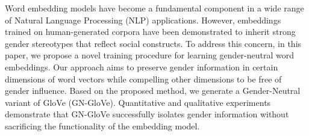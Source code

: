 Word embedding models have become a fundamental component in a wide range of Natural Language Processing (NLP) applications. 
However, embeddings trained on human-generated corpora have been demonstrated to inherit strong gender stereotypes that reflect social constructs. 
To address this concern, in this paper, we propose a novel training procedure for learning gender-neutral word embeddings. Our approach aims to preserve gender information in certain dimensions of word vectors while compelling other dimensions to be free of gender influence. Based on the proposed method, we generate a Gender-Neutral variant of GloVe (GN-GloVe). Quantitative and qualitative experiments demonstrate that GN-GloVe successfully isolates gender information without sacrificing the functionality of the embedding model.
